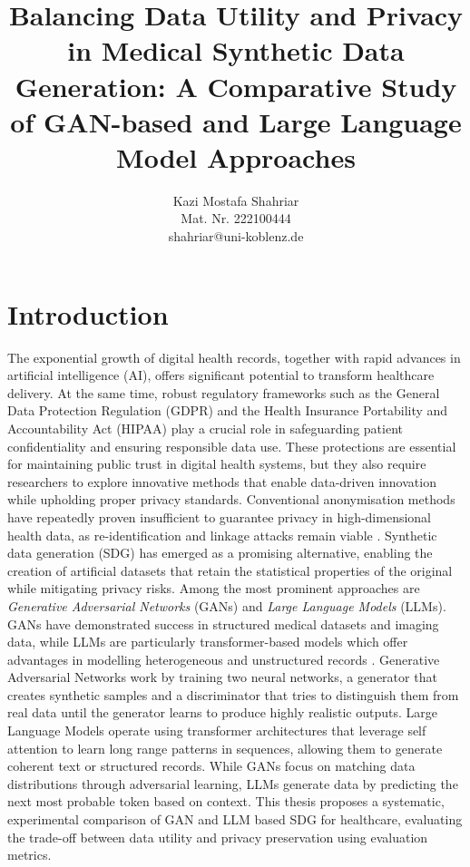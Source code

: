 \documentclass[master,proposal,extern,palatino]{rgseThesis}
\author{Kazi Mostafa Shahriar\\[1ex] \normalsize Mat. Nr. 222100444 \\[1ex] \normalsize shahriar@uni-koblenz.de}
\title{Balancing Data Utility and Privacy in Medical Synthetic Data Generation: A Comparative Study of GAN-based and Large Language Model Approaches}
\begin{document}

    \maketitle

    \tableofcontents
    \newpage


    \section{Introduction}
The exponential growth of digital health records, together with rapid advances in artificial intelligence (AI), offers significant potential to transform healthcare delivery. At the same time, robust regulatory frameworks such as the General Data Protection Regulation (GDPR) and the Health Insurance Portability and Accountability Act (HIPAA) play a crucial role in safeguarding patient confidentiality and ensuring responsible data use. These protections are essential for maintaining public trust in digital health systems, but they also require researchers to explore innovative methods that enable data-driven innovation while upholding proper privacy standards. Conventional anonymisation methods have repeatedly proven insufficient to guarantee privacy in high-dimensional health data, as re-identification and linkage attacks remain viable \cite{Murtaza2023}.  
Synthetic data generation (SDG) has emerged as a promising alternative, enabling the creation of artificial datasets that retain the statistical properties of the original while mitigating privacy risks. Among the most prominent approaches are \textit{Generative Adversarial Networks} (GANs) and \textit{Large Language Models} (LLMs). GANs have demonstrated success in structured medical datasets and imaging data, while LLMs are particularly transformer-based models which offer advantages in modelling heterogeneous and unstructured records \cite{Miletic2024}. \newline
Generative Adversarial Networks work by training two neural networks, a generator that creates synthetic samples and a discriminator that tries to distinguish them from real data until the generator learns to produce highly realistic outputs. Large Language Models operate using transformer architectures that leverage self attention to learn long range patterns in sequences, allowing them to generate coherent text or structured records. While GANs focus on matching data distributions through adversarial learning, LLMs generate data by predicting the next most probable token based on context. \newline
This thesis proposes a systematic, experimental comparison of GAN and LLM based SDG for healthcare, evaluating the trade-off between data utility and privacy preservation using evaluation metrics.
\end{document}
